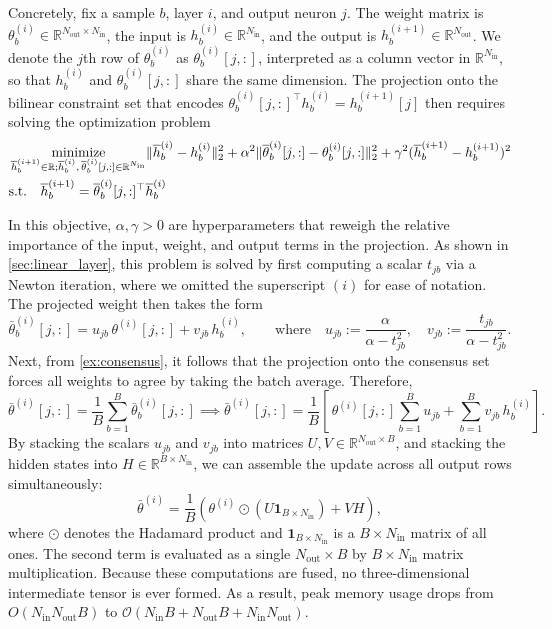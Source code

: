 Concretely, fix a sample $b$, layer $i$, and output neuron $j$. The weight
matrix is $\theta_b^{(i)} \in \mathbb{R}^{N_{\mathrm{out}} \times N_{\mathrm{in}}}$,
the input is $h^{(i)}_{b} \in \mathbb{R}^{N_{\mathrm{in}}}$, and the output is
$h^{(i+1)}_{b} \in \mathbb{R}^{N_{\mathrm{out}}}$. We denote the $j$th row of
$\theta_b^{(i)}$ as $\theta^{(i)}_b[j,:]$, interpreted as a column vector in
$\mathbb{R}^{N_{\mathrm{in}}}$, so that $h^{(i)}_{b}$ and $\theta^{(i)}_b[j,:]$
share the same dimension. The projection onto the bilinear constraint set that encodes $\theta^{(i)}_b[j,:]^\top h^{(i)}_{b} = h^{(i+1)}_{b}[j]$ then requires solving the optimization problem
\[
\begin{aligned}
    &\operatorname*{minimize}_{\substack{\overline{h}^{(i+1)}_b\in\mathbb{R};\overline{h}^{(i)}_b,\,\overline{\theta}_b^{(i)}[j,:]\in\mathbb{R}^{N_{\mathrm{in}}}}}
    \lVert \overline{h}^{(i)}_b - h^{(i)}_b \rVert^2_2
    + \alpha^2 \lVert \overline{\theta}_b^{(i)}[j,:] - \theta_b^{(i)}[j,:] \rVert^2_2
    + \gamma^2 (\overline{h}^{(i+1)}_b - h^{(i+1)}_b)^2 \\
    &\text{s.t.} \quad \overline{h}^{(i+1)}_b = \overline{\theta}_b^{(i)}[j,:]^\top \overline{h}^{(i)}_b
\end{aligned}
\]

In this objective, $\alpha, \gamma > 0$ are hyperparameters that reweigh the relative
importance of the input, weight, and output terms in the projection. As shown in \cref{sec:linear_layer}, this problem is solved by first computing a scalar $t_{jb}$ via a Newton iteration, where we omitted the superscript $(i)$ for ease of notation. The projected weight then takes the form
\[
    \bar\theta^{(i)}_{b}[j,:] = u_{jb}\,\theta^{(i)}[j,:] + v_{jb}\, h^{(i)}_{b}{}, \qquad \text{where} \quad u_{jb} := \frac{\alpha}{\alpha - t_{jb}^{2}}, \quad v_{jb} := \frac{t_{jb}}{\alpha - t_{jb}^{2}}.
\]
Next, from \cref{ex:consensus}, it follows that the projection onto the consensus set forces all weights to agree by taking the batch average. Therefore,
\[
    \bar\theta^{(i)}[j,:] = \frac{1}{B} \sum_{b=1}^{B} \bar\theta^{(i)}_{b}[j,:] \implies    \bar\theta^{(i)}[j,:] =\frac{1}{B}\!\left[\, \theta^{(i)}[j,:] \sum_{b=1}^{B} u_{jb} + \sum_{b=1}^{B} v_{jb}\, h^{(i)}_{b}{} \right].
\]
By stacking the scalars $u_{jb}$ and $v_{jb}$ into matrices $U, V \in \mathbb{R}^{N_{\mathrm{out}} \times B}$, and stacking the hidden states into $H \in \mathbb{R}^{B \times N_{\mathrm{in}}}$, we can assemble the update across all output rows simultaneously:
\[
    \bar{\theta}^{(i)} = \frac{1}{B} \left( \theta^{(i)} \odot (U\mathbf{1}_{B\times N_{\mathrm{in}}}) + V H \right),
\]
where $\odot$ denotes the Hadamard product and $\mathbf{1}_{B\times N_{\mathrm{in}}}$ is a $B\times N_{\mathrm{in}}$ matrix of all ones. The second term is evaluated as a single $N_{\mathrm{out}} \times B$ by $B \times N_{\mathrm{in}}$ matrix multiplication. Because these computations are fused, no three-dimensional intermediate tensor is ever formed. As a result, peak memory usage drops from $O(N_{\mathrm{in}}N_{\mathrm{out}}B)$ to $\mathcal{O}(N_{\mathrm{in}}B + N_{\mathrm{out}}B + N_{\mathrm{in}}N_{\mathrm{out}})$.

